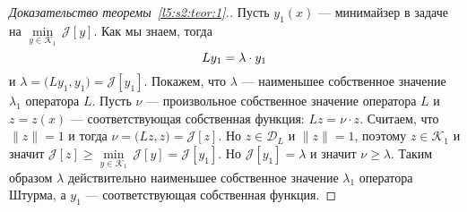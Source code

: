 \documentclass[12pt,a4paper,openany,fleqn]{book}
\newcommand{\J}{\ensuremath{\mathcal{J}}}
\newcommand{\mc}[1]{\ensuremath{\mathcal{#1}}}
\newcommand{\K}{\mc{K}}
\newcommand{\norm}[1]{\ensuremath{\|#1\|}}
\theoremstyle{definition}
\begin{document}
\begin{proof}[Доказательство теоремы~\ref{l5:s2:teor:1}.]

	 Пусть $y_1(x)$ --- минимайзер в задаче на $\min\limits_{y\in\K_1}\,\J[y]$. Как мы знаем, тогда 
	\begin{equation*}
		\hfill Ly_1=\lambda\cdot y_1\hfill
	\end{equation*} 
	и $\lambda=\big(Ly_1,y_1\big)=\J[y_1]$. Покажем, что $\lambda$ --- наименьшее собственное значение $\lambda_1$ оператора $L$. Пусть $\nu$ --- произвольное собственное значение оператора $L$ и $z=z(x)$ --- соответствующая собственная функция: $Lz=\nu\cdot z$. Считаем, что $\norm{z}=1$ и тогда $\nu=\big(Lz,z\big)=\J[z]$. Но $z\in\mc{D}_{L}$ и $\norm{z}=1$, поэтому $z\in\K_1$ и значит $\J[z]\geqslant\min\limits_{y\in\K_1}\,\J[y]=\J[y_1]$. Но $\J[y_1]=\lambda$ и значит $\nu\geqslant\lambda$. Таким образом $\lambda$ действительно наименьшее собственное значение $\lambda_1$ оператора Штурма, а $y_1$ --- соответствующая собственная функция.
	\end{proof}
\end{document}
